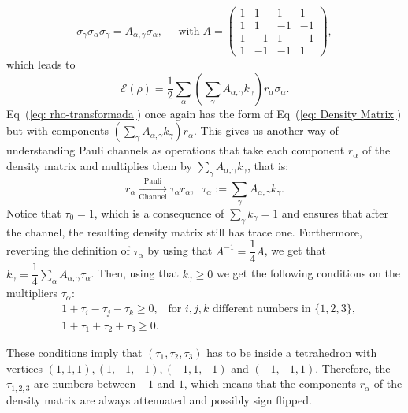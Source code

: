 \documentclass[10pt,letterpaper]{article} %
\newcommand{\eref}[1]{Eq~(\ref{#1})}
\begin{document}
\begin{equation}
\label{eq: propiedad-pauli}
\sigma_{\gamma} \sigma_{\alpha} \sigma_{\gamma} = A_{\alpha,\gamma} \sigma_{\alpha}, \;\;\;\;\; \text{with} \; A = \begin{pmatrix}
1 & 1 & 1 & 1\\
1 & 1 & -1 &-1 \\
1 & -1 & 1 & -1 \\
1 & -1 & -1 & 1
\end{pmatrix},
\end{equation}
which leads to
\begin{equation}
\label{eq: rho-transformada}
\mathcal{E}(\rho) = \dfrac{1}{2} \sum_{\alpha} \left(\sum_{\gamma} A_{\alpha, \gamma} k_{\gamma} \right) r_{\alpha} \sigma_{\alpha}.
\end{equation}
\eref{eq: rho-transformada} once again has the form of \eref{eq: Density Matrix}  
but with components $\left( \sum_{\gamma} A_{\alpha,\gamma} k_{\gamma} \right) r_{\alpha}$.
This gives us another way of understanding Pauli channels
as operations that take each component $r_{\alpha}$
of the density matrix and multiplies them
by $\sum_{\gamma} A_{\alpha,\gamma} k_{\gamma}$, 
that is:
\begin{equation}
\label{eq: multipliers}
r_{\alpha}  \xrightarrow[\text{Channel}]{\text{Pauli}}  \tau_{\alpha} r_{\alpha} ,\;\; \tau_{\alpha} := \sum_{\gamma} A_{\alpha,\gamma} k_{\gamma}.
\end{equation}
Notice that $\tau_0 = 1$, which is a consequence of $\sum_{\gamma}k_{\gamma}=1$
and ensures that after the channel, the resulting density matrix still has trace one. 
Furthermore, reverting the definition of $\tau_{\alpha}$ by using that $A^{-1} = \dfrac{1}{4} A$, 
we get that $k_{\gamma} = \dfrac{1}{4} \sum_{\alpha} A_{\alpha,\gamma} \tau_{\alpha}$.
Then, using that $k_{\gamma} \geq 0$
we get the following conditions on the multipliers $\tau_{\alpha}$:
\begin{eqnarray}
\label{eq: conditions-tetrahedron}
&1+\tau_i -\tau_j - \tau_k \geq 0,  \;\;\; \text{for $i,j,k$ different numbers in $\{1,2,3\}$}, \\
&1+\tau_1 + \tau_2 + \tau_3 \geq 0.
\end{eqnarray}

These conditions imply that $(\tau_1,\tau_2,\tau_3)$
has to be inside a tetrahedron with
vertices $(1,1,1), (1,-1,-1), (-1,1,-1)$ and $(-1,-1,1)$. 
Therefore, the $\tau_{1,2,3}$ are numbers between 
$-1$ and $1$, which means that the components
$r_{\alpha}$ of the density matrix are always 
attenuated and possibly sign flipped.
\end{document}
